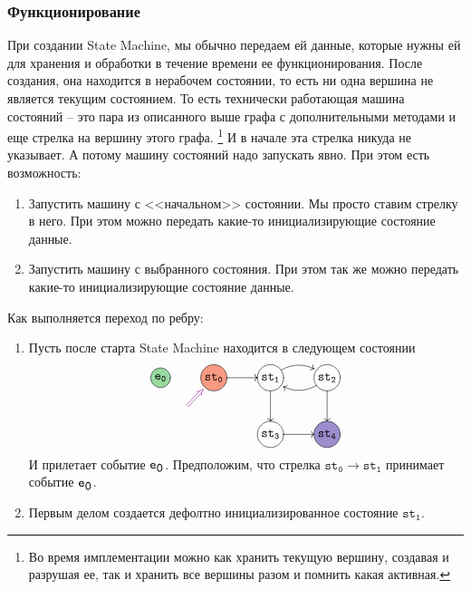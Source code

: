 \documentclass{article}
\begin{document}
{\subsubsection{Функционирование}

При создании State Machine, мы обычно передаем ей данные, которые нужны ей для хранения и обработки в течение времени ее функционирования.
После создания, она находится в нерабочем состоянии, то есть ни одна вершина не является текущим состоянием.
То есть технически работающая машина состояний -- это пара из описанного выше графа с дополнительными методами и еще стрелка на вершину этого графа.%
\footnote{Во время имплементации можно как хранить текущую вершину, создавая и разрушая ее, так и хранить все вершины разом и помнить какая активная.}
И в начале эта стрелка никуда не указывает.
А потому машину состояний надо запускать явно.
При этом есть возможность:
\begin{enumerate}
\item Запустить машину с <<начальном>> состоянии.
Мы просто ставим стрелку в него.
При этом можно передать какие-то инициализирующие состояние данные.

\item Запустить машину с выбранного состояния.
При этом так же можно передать какие-то инициализирующие состояние данные.
\end{enumerate}
Как выполняется переход по ребру:
\begin{enumerate}
\item Пусть после старта State Machine находится в следующем состоянии
\[
\xymatrix{
  *+=+[o][F-][F*:EventColor]{\texttt{e}_\texttt{0}}&
  *+=+[o][F-][F*:InitialStateColor]{\texttt{st}_\texttt{0}}\ar[r]&
  *+=+[o][F-]{\texttt{st}_\texttt{1}}\ar@/^10pt/[r]\ar[d]&
  *+=+[o][F-]{\texttt{st}_\texttt{2}}\ar@/^10pt/[l]\ar[d]\\
  {}\ar@{}[ru]|(.50){}="A"|(0.8){}="B"\ar@[Plum]@{=>} "A";"B" 
  &
  {}&
  *+=+[o][F-]{\texttt{st}_\texttt{3}}\ar[r]&
  *+=+[o][F-][F*:FinalStateColor]{\texttt{st}_\texttt{4}}\\
}
\]
И прилетает событие $\verb"e"_{\verb"0"}$.
Предположим, что стрелка $\texttt{st}_\texttt{0}\to\texttt{st}_\texttt{1}$ принимает событие $\verb"e"_{\verb"0"}$.

\item Первым делом создается дефолтно инициализированное состояние $\texttt{st}_\texttt{1}$.


\end{enumerate}}
\end{document}
